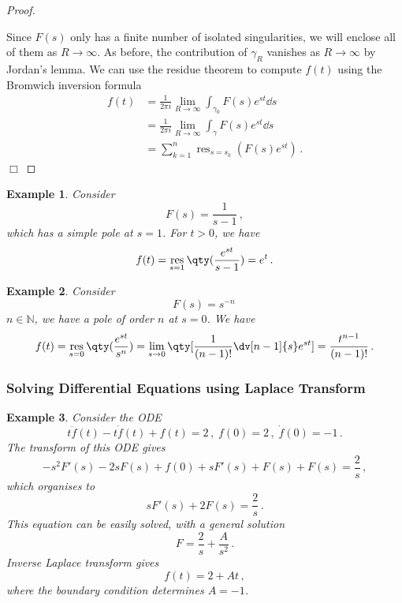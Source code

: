 \documentclass{article}
\theoremstyle{plain}\theoremheaderfont{\normalfont\itshape}\theorembodyfont{\rmfamily}\theoremseparator{.}\newtheorem*{rem}{Remark}\newtheorem*{ex}{Example}\newtheorem*{proof}{Proof}\newtheorem*{altp}{Alternative proof}
\theoremstyle{plain}\theoremheaderfont{\normalfont\bfseries}\theorembodyfont{\rmfamily}\theoremseparator{.}\newtheorem{thm}{Theorem}[section]\newtheorem{lem}[thm]{Lemma}\newtheorem{prop}[thm]{Proposition}\newtheorem*{cor}{Corollary}\newtheorem{defn}[thm]{Definition}\newtheorem{clm}[thm]{Claim}\newtheorem{clminproof}{Claim}
\theoremstyle{break}\theoremheaderfont{\normalfont\itshape}\theorembodyfont{\rmfamily}\theoremseparator{.\medskip}\newtheorem*{proofskip}{Proof}\newtheorem*{exs}{Examples}\newtheorem*{rems}{Remarks}
\theoremstyle{break}\theoremheaderfont{\normalfont\bfseries}\theorembodyfont{\rmfamily}\theoremseparator{.\medskip}\newtheorem{lemskip}[thm]{Lemma}\newtheorem{defnskip}[thm]{Definition}\newtheorem{propskip}[thm]{Proposition}\newtheorem{thmskip}[thm]{Theorem}
\numberwithin{equation}{section}
\newcommand{\qed}{\hfill\ensuremath{\Box}}
\DeclareMathOperator*{\res}{res}
\begin{document}
\begin{proof}
\begin{figure}
		\end{figure}

		Since \(F(s)\) only has a finite number of isolated singularities, we will enclose all of them as \(R\to \infty\). As before, the contribution of \(\gamma_R\) vanishes as \(R\to\infty\) by Jordan's lemma. We can use the residue theorem to compute \(f(t)\) using the Bromwich inversion formula
		\begin{align*}
			f(t)&=\frac{1}{2\pi i}\lim_{R\to\infty}\int_{\gamma_0}F(s)e^{st}\dd{s}\\
			&=\frac{1}{2\pi i}\lim_{R\to\infty}\int_{\gamma}F(s)e^{st}\dd{s}\\
			&=\sum_{k=1}^{n}\res_{s=s_k}(F(s)e^{st})\,.
		\end{align*}\qed
	\end{proof}

	\begin{ex}
		Consider
		\[F(s)=\frac{1}{s-1}\,,\]
		which has a simple pole at \(s=1\). For \(t>0\), we have
		\[f(t)=\res_{s=1}\qty(\frac{e^{st}}{s-1})=e^t\,.\]
	\end{ex}
	\begin{ex}
		Consider
		\[F(s)=s^{-n}\,\]
		\(n\in\mathbb{N}\), we have a pole of order \(n\) at \(s=0\). We have
		\[f(t)=\res_{s=0}\qty(\frac{e^{st}}{s^n})=\lim_{s\to 0}\qty[\frac{1}{(n-1)!}\dv[n-1]{s}e^{st}]=\frac{t^{n-1}}{(n-1)!}\,.\]
	\end{ex}
	\subsubsection{Solving Differential Equations using Laplace Transform}
	\begin{ex}
		Consider the ODE
		\[t\ddot{f}(t)-t\dot{f}(t)+f(t)=2\,,\; f(0)=2\,,\; \dot{f}(0)=-1\,.\]
		The transform of this ODE gives
		\[-s^2F'(s)-2sF(s)+f(0)+sF'(s)+F(s)+F(s)=\frac{2}{s}\,,\]
		which organises to
		\[sF'(s)+2F(s)=\frac{2}{s}\,.\]
		This equation can be easily solved, with a general solution
		\[F=\frac{2}{s}+\frac{A}{s^2}\,.\]
		Inverse Laplace transform gives
		\[f(t)=2+At\,,\]
		where the boundary condition determines \(A=-1\).
	\end{ex}
\end{document}
